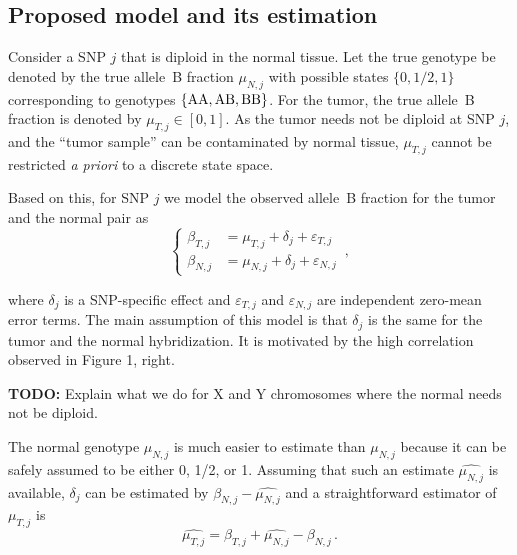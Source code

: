 \documentclass[10pt]{bmc_article}
\newenvironment{bmcformat}{\fussy\setboolean{publ}{true}}{\fussy}
\newcommand{\gAA}{\textnormal{AA}\xspace}
\newcommand{\gAB}{\textnormal{AB}\xspace}
\newcommand{\gBB}{\textnormal{BB}\xspace}
\newcommand{\eps}{\varepsilon\xspace}
\newenvironment{TODO}{\color{red}\textbf{TODO:}}{}
\begin{document}
\begin{bmcformat}
\subsection*{Proposed model and its estimation}
Consider a SNP $j$ that is diploid in the normal tissue.  
Let the true genotype be denoted by the true allele~B fraction $\mu_{N,j}$ with possible states $\{0,1/2,1\}$ corresponding to genotypes $\{\gAA,\gAB,\gBB\}$. For the tumor, the true allele~B fraction is denoted by  $\mu_{T,j} \in [0,1]$. As the tumor needs not be diploid at SNP $j$, and the ``tumor sample'' can be contaminated by normal tissue, $\mu_{T,j}$ cannot be restricted \textit{a priori} to a discrete state space.

Based on this, for SNP $j$ we model the observed allele~B fraction for the tumor and the normal pair as
\begin{displaymath}
  \begin{cases}
    \beta_{T,j} & =  \mu_{T,j} + \delta_{j} + \eps_{T,j}\\
    \beta_{N,j}  & =  \mu_{N,j} + \delta_{j} + \eps_{N,j}
  \end{cases}\,,
\end{displaymath}

where $\delta_{j}$ is a SNP-specific effect and $\eps_{T,j}$ and $\eps_{N,j}$ are independent zero-mean error terms. The main assumption of this model is that $\delta_{j}$ is the same for the tumor and the normal hybridization. It is motivated by the high correlation observed in Figure 1, right.

\begin{TODO}
  Explain what we do for X and Y chromosomes where the normal needs not be diploid.
\end{TODO}

The normal genotype $\mu_{N,j}$ is much easier to estimate than $\mu_{N,j}$ because it can be safely assumed to be either 0, 1/2, or 1. Assuming that such an estimate $\widehat{\mu_{N,j}}$ is available, $\delta_j$ can be estimated by  $\beta_{N,j} - \widehat{\mu_{N,j}}$ and a straightforward estimator of $\mu_{T,j}$ is 
\begin{displaymath}
     \widehat{\mu_{T,j}} = \beta_{T,j} + \widehat{\mu_{N,j}} - \beta_{N,j}\,.
\end{displaymath}



\end{bmcformat}
\end{document}
